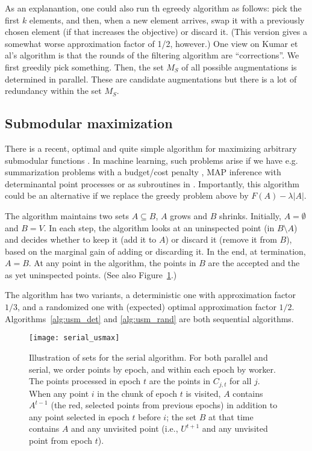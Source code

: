 \documentclass{article}
\begin{document}
As an explanantion, one could also run th egreedy algorithm as follows: pick the first $k$ elements, and then, when a new element arrives, swap it with a previously chosen element (if that increases the objective) or discard it. (This version gives a somewhat worse approximation factor of 1/2, however.)
One view on Kumar et al's algorithm is that the rounds of the filtering algorithm are ``corrections''. We first greedily pick something. Then, the set $M_S$ of all possible augmentations is determined in parallel. These are candidate augmentations but there is a lot of redundancy within the set $M_S$.


\subsection{Submodular maximization}
There is a recent, optimal and quite simple algorithm for maximizing arbitrary submodular functions \citep{buchbinder12}. In machine learning, such problems arise if we have e.g. summarization problems with a budget/cost penalty \citep{krause08}, MAP inference with determinantal point processes \citep{gillenwater12} or as subroutines in \citep{reed13}. Importantly, this algorithm could be an alternative if we replace the greedy problem above by $F(A) - \lambda |A|$.

The algorithm maintains two sets $A \subseteq B$, $A$ grows and $B$ shrinks. Initially, $A = \emptyset$ and $B = V$.
In each step, the algorithm looks at an uninspected point (in $B \setminus A$) and decides whether to keep it (add it to $A$) or discard it (remove it from $B$), based on the marginal gain of adding or discarding it. In the end, at termination, $A = B$. At any point in the algorithm, the points in $B$ are the accepted and the as yet uninspected points. (See also Figure~\ref{fig:serial_array}.)

The algorithm has two variants, a deterministic one with approximation factor $1/3$, and a randomized one with (expected) optimal approximation factor $1/2$. Algorithms~\ref{alg:usm_det} and \ref{alg:usm_rand} are both sequential algorithms.

\begin{figure}
  \centering
  \texttt{[image: serial\_usmax]}
  \caption{Illustration of sets for the serial algorithm. For both parallel and serial, we order points by epoch, and within each epoch by worker. The points processed in epoch $t$ are the points in $C_{j,t}$ for all $j$. When any point $i$ in the chunk of epoch $t$ is visited, $A$ contains $A^{t-1}$ (the red, selected points from previous epochs) in addition to any point selected in epoch $t$ before $i$; the set $B$ at that time contains $A$ and any unvisited point (i.e., $U^{t+1}$ and any unvisited point from epoch $t$).}
  \label{fig:serial_array}
\end{figure}
\end{document}

